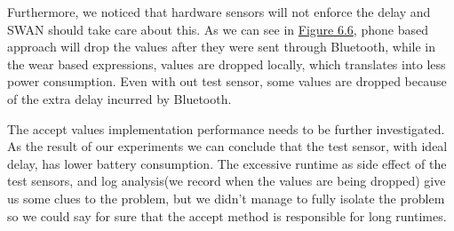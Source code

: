 \begin{itemize}
Furthermore, we noticed that hardware sensors will not enforce the delay and SWAN should take care about this. As we can see in \hyperref[fig:swan_drop_val]{Figure 6.6}, 
phone based approach will drop the values after they were sent through Bluetooth, while in the wear based expressions, values are dropped locally, which translates into less power consumption.
Even with out test sensor, some values are dropped because of the extra delay incurred by Bluetooth.

 The accept values implementation performance needs to be further investigated.
 As the result of our experiments we can conclude that the test sensor, with ideal delay, has lower battery consumption.
 The excessive runtime as side effect of the test sensors, and log analysis(we record when the values are being dropped) give us some clues to the problem, but we didn't manage to fully isolate the
 problem so we could say for sure that the accept method is responsible for long runtimes.

\end{itemize}
